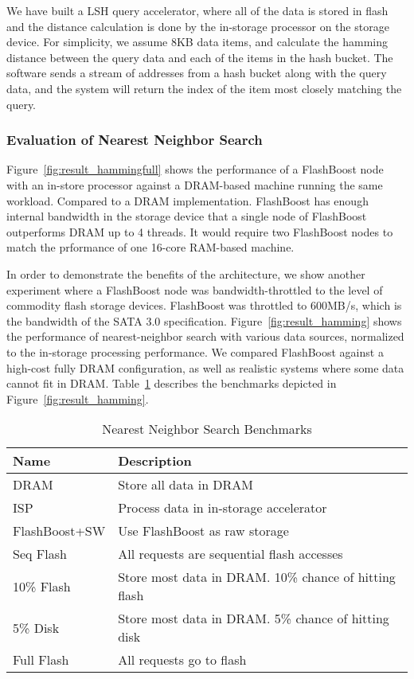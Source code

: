 We have built a LSH query accelerator, where all of the data is stored in flash
and the distance calculation is done by the in-storage processor on the storage
device. For simplicity, we assume 8KB data items, and calculate the hamming
distance between the query data and each of the items in the hash bucket. The
software sends a stream of addresses from a hash bucket along with the query
data, and the system will return the index of the item most closely matching the
query. 


\subsubsection{Evaluation of Nearest Neighbor Search}

Figure~\ref{fig:result_hammingfull} shows the performance of a FlashBoost node
with an in-store processor against a DRAM-based machine running the same
workload. Compared to a DRAM implementation. FlashBoost has enough internal
bandwidth in the storage device that a single node of FlashBoost
outperforms DRAM up to 4 threads. It would require two FlashBoost nodes to match
the prformance of one 16-core RAM-based machine.

In order to demonstrate the benefits of the architecture, we show another
experiment where a FlashBoost node was bandwidth-throttled to the level of
commodity flash storage devices. FlashBoost was throttled to 600MB/s, which is
the bandwidth of the SATA 3.0 specification.
Figure~\ref{fig:result_hamming} shows the performance of nearest-neighbor search
with various data sources, normalized to the in-storage processing performance.
We compared FlashBoost against a high-cost fully DRAM configuration, as well as
realistic systems where some data cannot fit in DRAM.
Table~\ref{tab:nearest_neighbor} describes the benchmarks depicted in
Figure~\ref{fig:result_hamming}.

\begin{table}[h]\footnotesize
\begin{tabular}{l | p{0.25\paperwidth}}
\arraystretch{0.9}
Name & Description \\
\hline \hline
DRAM & Store all data in DRAM \\
ISP & Process data in in-storage accelerator \\
FlashBoost+SW & Use FlashBoost as raw storage \\
Seq Flash & All requests are sequential flash accesses \\
10\% Flash & Store most data in DRAM. 10\% chance of hitting flash \\
5\% Disk & Store most data in DRAM. 5\% chance of hitting disk \\
Full Flash & All requests go to flash \\
\hline
\end{tabular}
\caption{Nearest Neighbor Search Benchmarks}
\label{tab:nearest_neighbor}
\end{table}

